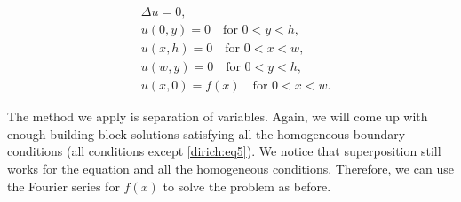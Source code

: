 \begin{center}
\begin{minipage}[b]{2.6in}
\vspace{\fill}
\begin{align}
& \Delta u = 0 , \label{dirich:eq1} \\
& u(0,y) = 0 \quad \text{for }  0 < y < h,\label{dirich:eq2} \\
& u(x,h) = 0 \quad \text{for }  0 < x < w,\label{dirich:eq3} \\
& u(w,y) = 0 \quad \text{for }  0 < y < h,\label{dirich:eq4} \\
& u(x,0) = f(x) \quad \text{for }  0 < x < w.\label{dirich:eq5}
\end{align}
\vspace{\fill}
\end{minipage}
\qquad
\qquad
\end{center}

The method we apply is separation of variables.  Again, we will
come up with enough building-block
solutions satisfying all the homogeneous boundary conditions
(all conditions except \eqref{dirich:eq5}).  We notice that superposition
still works for the equation and all the homogeneous conditions.
Therefore,
we can use the Fourier series for $f(x)$ to solve the
problem as before.

